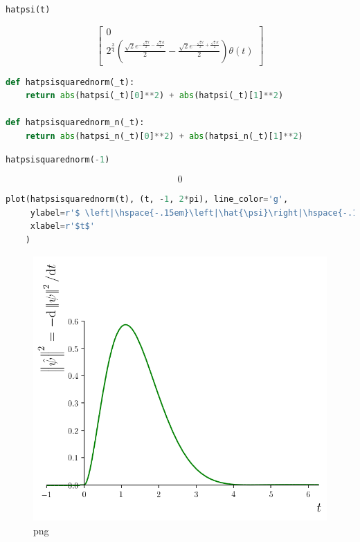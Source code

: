 \begin{lstlisting}[language=Python]
hatpsi(t)
\end{lstlisting}

\begin{equation}\label{eq:sympy:hatpsi}
    \left[\begin{matrix}0\\2^{\frac{3}{4}} \left(\frac{\sqrt{2} e^{- \frac{\sqrt{2} t}{2} - \frac{\sqrt{2} i t}{2}}}{2} - \frac{\sqrt{2} e^{- \frac{\sqrt{2} t}{2} + \frac{\sqrt{2} i t}{2}}}{2}\right) \theta\left(t\right)\end{matrix}\right]
\end{equation}

\begin{lstlisting}[language=Python]
def hatpsisquarednorm(_t):
    return abs(hatpsi(_t)[0]**2) + abs(hatpsi(_t)[1]**2)

def hatpsisquarednorm_n(_t):
    return abs(hatpsi_n(_t)[0]**2) + abs(hatpsi_n(_t)[1]**2)
\end{lstlisting}

\begin{lstlisting}[language=Python]
hatpsisquarednorm(-1)
\end{lstlisting}

\[0\]

\begin{lstlisting}[language=Python]
plot(hatpsisquarednorm(t), (t, -1, 2*pi), line_color='g',
     ylabel=r'$ \left|\hspace{-.15em}\left|\hat{\psi}\right|\hspace{-.15em}\right|^2 $ =  $ - \mathrm{d}\left|\hspace{-0.15em}\left|\psi\right|\hspace{-0.15em}\right|^2 / \mathrm{d}t $',
     xlabel=r'$t$'
    )
\end{lstlisting}

\begin{figure}
\centering
\includegraphics[width=0.6\linewidth]{output_51_0.png}
\caption[]{png}
\end{figure}

